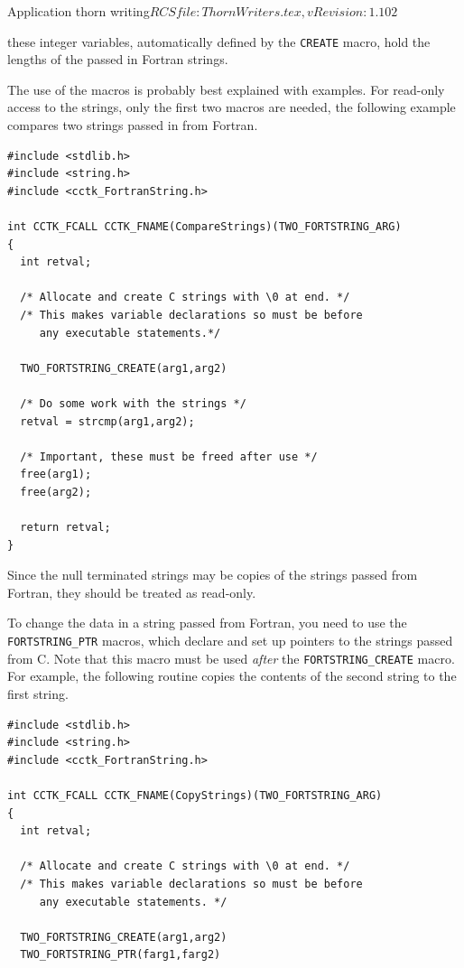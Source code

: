 \begin{cactuspart}{2}{Application thorn writing}{$RCSfile: ThornWriters.tex,v $}{$Revision: 1.102 $}
\begin{Lentry}
\item[{\tt cctk\_strlen<1|2|3>}] these integer variables,
	automatically defined by
	the {\tt CREATE} macro, hold the lengths of the passed in
	Fortran strings.
\end{Lentry}

The use of the macros is probably best explained with examples.
For read-only access to the strings, only the first two macros are needed,
the following example compares two strings passed in from Fortran.

\begin{verbatim}
#include <stdlib.h>
#include <string.h>
#include <cctk_FortranString.h>

int CCTK_FCALL CCTK_FNAME(CompareStrings)(TWO_FORTSTRING_ARG)
{
  int retval;

  /* Allocate and create C strings with \0 at end. */
  /* This makes variable declarations so must be before
     any executable statements.*/

  TWO_FORTSTRING_CREATE(arg1,arg2)

  /* Do some work with the strings */
  retval = strcmp(arg1,arg2);

  /* Important, these must be freed after use */
  free(arg1);
  free(arg2);

  return retval;
}

\end{verbatim}

Since the null terminated strings may be copies of the strings passed
from Fortran, they should be treated as read-only.

To change the data in a string passed from Fortran, you need to use
the {\tt FORTSTRING\_PTR} macros, which declare and set up pointers
to the strings passed from C. Note that this macro must be used
{\em after} the {\tt FORTSTRING\_CREATE} macro. For example, the
following routine copies the contents of the second string to the
first string.

\begin{verbatim}
#include <stdlib.h>
#include <string.h>
#include <cctk_FortranString.h>

int CCTK_FCALL CCTK_FNAME(CopyStrings)(TWO_FORTSTRING_ARG)
{
  int retval;

  /* Allocate and create C strings with \0 at end. */
  /* This makes variable declarations so must be before
     any executable statements. */

  TWO_FORTSTRING_CREATE(arg1,arg2)
  TWO_FORTSTRING_PTR(farg1,farg2)


\end{verbatim}
\end{cactuspart}

